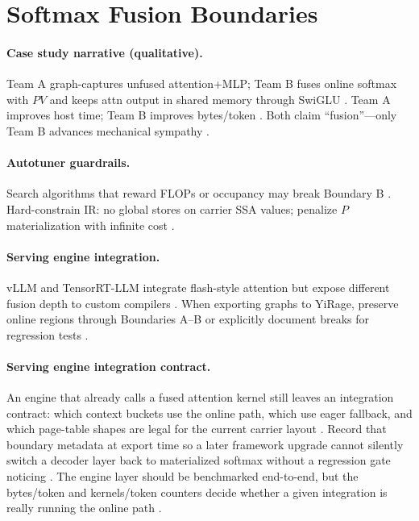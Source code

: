 \section{Softmax Fusion Boundaries}
\label{sec:ch10_fusion_boundary}
\paragraph{Case study narrative (qualitative).} Team A graph-captures unfused attention+MLP; Team B fuses online softmax with $PV$ and keeps attn output in shared memory through SwiGLU \citep{nvidia2024cudagraphs,taxbreak2026}. Team A improves host time; Team B improves bytes/token \citep{memoryfloor2026,patel2025llminference}. Both claim ``fusion''---only Team B advances mechanical sympathy \citep{dao2022flashattention,yirage2026}.

\paragraph{Autotuner guardrails.} Search algorithms that reward FLOPs or occupancy may break Boundary B \citep{chen2020compilerbasedhardw,yirage2026}. Hard-constrain IR: no global stores on carrier SSA values; penalize $P$ materialization with infinite cost \citep{memoryfloor2026,taxbreak2026}.

\paragraph{Serving engine integration.} vLLM and TensorRT-LLM integrate flash-style attention but expose different fusion depth to custom compilers \citep{kwon2023vllm,patel2025llminference}. When exporting graphs to YiRage, preserve online regions through Boundaries A--B or explicitly document breaks for regression tests \citep{yirage2026,liu2024deepseekv3}.

\paragraph{Serving engine integration contract.}
An engine that already calls a fused attention kernel still leaves an integration contract: which context buckets use the online path, which use eager fallback, and which page-table shapes are legal for the current carrier layout \citep{kwon2023vllm,patel2025llminference}. Record that boundary metadata at export time so a later framework upgrade cannot silently switch a decoder layer back to materialized softmax without a regression gate noticing \citep{yirage2026,memoryfloor2026}. The engine layer should be benchmarked end-to-end, but the bytes/token and kernels/token counters decide whether a given integration is really running the online path \citep{taxbreak2026,chen2020compilerbasedhardw}.



